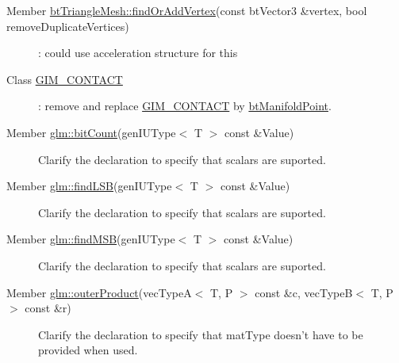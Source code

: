 \label{todo__todo000024}
\hypertarget{todo__todo000024}{}
 \begin{description}
\item[Member \hyperlink{classbt_triangle_mesh_3b521a1faa5862a818d9f983230749a2}{btTriangleMesh::findOrAddVertex}(const btVector3 \&vertex, bool removeDuplicateVertices) ]: could use acceleration structure for this \end{description}


\label{todo__todo000025}
\hypertarget{todo__todo000025}{}
 \begin{description}
\item[Class \hyperlink{class_g_i_m___c_o_n_t_a_c_t}{GIM\_\-CONTACT} ]: remove and replace \hyperlink{class_g_i_m___c_o_n_t_a_c_t}{GIM\_\-CONTACT} by \hyperlink{classbt_manifold_point}{btManifoldPoint}. \end{description}


\label{todo__todo000045}
\hypertarget{todo__todo000045}{}
 \begin{description}
\item[Member \hyperlink{group__core__func__integer_gccacb39d16885cc32fd8d5c95ab49da8}{glm::bitCount}(genIUType$<$ T $>$ const \&Value) ]Clarify the declaration to specify that scalars are suported. \end{description}


\label{todo__todo000046}
\hypertarget{todo__todo000046}{}
 \begin{description}
\item[Member \hyperlink{group__core__func__integer_gdda1c11511dea60cd3f0b414d8baa9c2}{glm::findLSB}(genIUType$<$ T $>$ const \&Value) ]Clarify the declaration to specify that scalars are suported. \end{description}


\label{todo__todo000047}
\hypertarget{todo__todo000047}{}
 \begin{description}
\item[Member \hyperlink{group__core__func__integer_g13ed58e71232a63dbc132b1be0f0ee9a}{glm::findMSB}(genIUType$<$ T $>$ const \&Value) ]Clarify the declaration to specify that scalars are suported. \end{description}


\label{todo__todo000048}
\hypertarget{todo__todo000048}{}
 \begin{description}
\item[Member \hyperlink{group__core__func__matrix_g47818f9809502f7a975a2c43a61fedb3}{glm::outerProduct}(vecTypeA$<$ T, P $>$ const \&c, vecTypeB$<$ T, P $>$ const \&r) ]Clarify the declaration to specify that matType doesn't have to be provided when used. \end{description}



